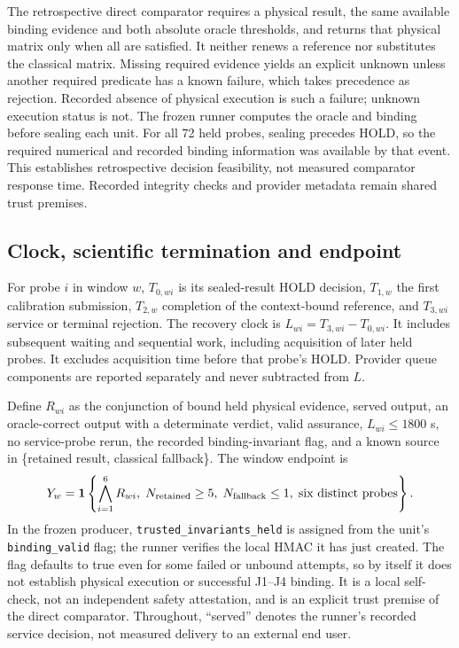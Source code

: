 \documentclass[pdflatex,sn-mathphys-num]{sn-jnl}
\begin{document}
The retrospective direct comparator requires a physical result, the same available binding evidence and both absolute oracle thresholds, and returns that physical matrix only when all are satisfied. It neither renews a reference nor substitutes the classical matrix. Missing required evidence yields an explicit unknown unless another required predicate has a known failure, which takes precedence as rejection. Recorded absence of physical execution is such a failure; unknown execution status is not. The frozen runner computes the oracle and binding before sealing each unit. For all 72 held probes, sealing precedes HOLD, so the required numerical and recorded binding information was available by that event. This establishes retrospective decision feasibility, not measured comparator response time. Recorded integrity checks and provider metadata remain shared trust premises.

\subsection{Clock, scientific termination and endpoint}
For probe $i$ in window $w$, $T_{0,wi}$ is its sealed-result HOLD decision, $T_{1,w}$ the first calibration submission, $T_{2,w}$ completion of the context-bound reference, and $T_{3,wi}$ service or terminal rejection. The recovery clock is $L_{wi}=T_{3,wi}-T_{0,wi}$. It includes subsequent waiting and sequential work, including acquisition of later held probes. It excludes acquisition time before that probe's HOLD. Provider queue components are reported separately and never subtracted from $L$.

Define $R_{wi}$ as the conjunction of bound held physical evidence, served output, an oracle-correct output with a determinate verdict, valid assurance, $L_{wi}\leq1800$ s, no service-probe rerun, the recorded binding-invariant flag, and a known source in \{retained result, classical fallback\}. The window endpoint is
\begin{equation}
Y_w=\mathbf{1}\left\{\bigwedge_{i=1}^{6}R_{wi},\;N_{\rm retained}\geq5,\;N_{\rm fallback}\leq1,\;\text{six distinct probes}\right\}.
\end{equation}
In the frozen producer, \texttt{trusted\_invariants\_held} is assigned from the unit's \texttt{binding\_valid} flag; the runner verifies the local HMAC it has just created. The flag defaults to true even for some failed or unbound attempts, so by itself it does not establish physical execution or successful J1--J4 binding. It is a local self-check, not an independent safety attestation, and is an explicit trust premise of the direct comparator. Throughout, ``served'' denotes the runner's recorded service decision, not measured delivery to an external end user.
\end{document}
